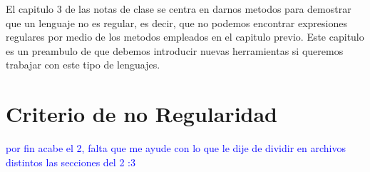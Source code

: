 El capitulo 3 de las notas de clase se centra en darnos metodos para demostrar que un lenguaje no es regular, es decir, que no podemos encontrar expresiones regulares por medio de los metodos empleados en el capitulo previo. Este capitulo es un preambulo de que debemos introducir nuevas herramientas si queremos trabajar con este tipo de lenguajes.

\section{Criterio de no Regularidad}

\textcolor{blue}{por fin acabe el 2, falta que me ayude con lo que le dije de dividir en archivos distintos las secciones del 2 :3}